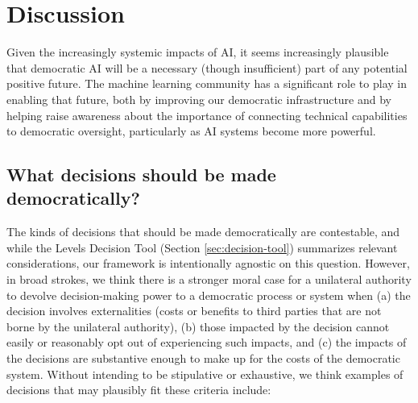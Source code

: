 \documentclass{article}
\begin{document}
\section{Discussion}

    Given the increasingly systemic impacts of AI, it seems increasingly plausible that democratic AI will be a necessary (though insufficient) part of any potential positive future.
    The machine learning community has a significant role to play in enabling that future, both by improving our democratic infrastructure and by helping raise awareness about the importance of connecting technical capabilities to democratic oversight, particularly as AI systems become more powerful. 

   
\subsection{What decisions should be made democratically?}
\label{sec:which-decisions}

    The kinds of decisions that should be made democratically are contestable, and while the Levels Decision Tool (Section \ref{sec:decision-tool}) summarizes relevant considerations, our framework is intentionally agnostic on this question.
    However, in broad strokes, we think there is a stronger moral case for a unilateral authority to devolve decision-making power to a democratic process or system when (a) the decision involves externalities (costs or benefits to third parties that are not borne by the unilateral authority), (b) those impacted by the decision cannot easily or reasonably opt out of experiencing such impacts, and (c) the impacts of the decisions are substantive enough to make up for the costs of the democratic system.
    Without intending to be stipulative or exhaustive, we think examples of decisions that may plausibly fit these criteria include:
\end{document}
